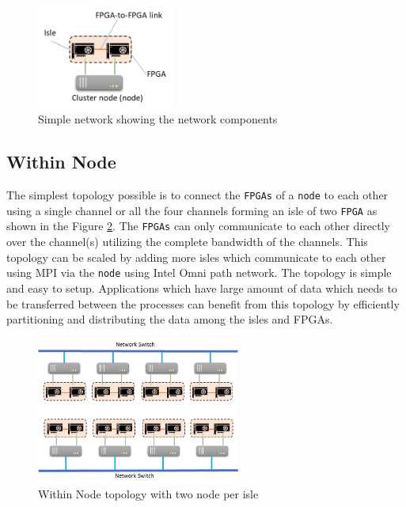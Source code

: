 \begin{figure}[h]%
    \centering
    \includegraphics[width=0.4\textwidth]{images/simple_network}
    \caption{Simple network showing the network components}
    \label{fig:simple_network}
\end{figure}


\subsection{Within Node}
\label{sec:within_node}

The simplest topology possible is to connect the \texttt{FPGAs} of a \texttt{node} to each other
using a single channel or all the four channels forming an isle of two \texttt{FPGA} as
shown in the Figure \ref{fig:within_node}. The \texttt{FPGAs} can only communicate to
each other directly over the channel(s) utilizing the complete bandwidth of the
channels. This topology can be scaled by adding more isles which communicate
to each other using MPI via the \texttt{node} using Intel Omni path network. The topology
is simple and easy to setup. Applications which have large amount of data which
needs to be transferred between the processes can benefit from this topology by
efficiently partitioning and distributing the data among the isles and FPGAs.

\begin{figure}[h]%
    \centering
    \includegraphics[width=0.6\textwidth]{images/within_node}
    \caption{Within Node topology with two node per isle}
    \label{fig:within_node}
\end{figure}

